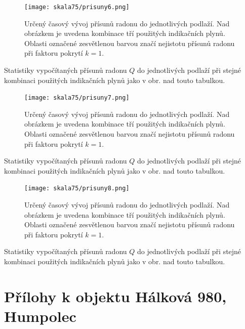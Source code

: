 \begin{figure}[H]
    \centering
    \texttt{[image: skala75/prisuny6.png]}
    \caption{Určený časový vývoj přísunů radonu do jednotlivých podlaží. Nad obrázkem je uvedena kombinace tří použitých indikačních plynů. Oblasti označené zesvětlenou barvou značí nejistotu přísunů radonu při faktoru pokrytí $k=1$.}
    \label{fig:skala75_prisuny6}
\end{figure}
\begin{table}[H]
    \centering
    \caption{Statistiky vypočítaných přísunů radonu $Q$ do jednotlivých podlaží při stejné kombinaci použitých indikačních plynů jako v obr. nad touto tabulkou.}
    \label{tab:skala75_prisuny6}
    
\end{table}

\begin{figure}[H]
    \centering
    \texttt{[image: skala75/prisuny7.png]}
    \caption{Určený časový vývoj přísunů radonu do jednotlivých podlaží. Nad obrázkem je uvedena kombinace tří použitých indikačních plynů. Oblasti označené zesvětlenou barvou značí nejistotu přísunů radonu při faktoru pokrytí $k=1$.}
    \label{fig:skala75_prisuny7}
\end{figure}
\begin{table}[H]
    \centering
    \caption{Statistiky vypočítaných přísunů radonu $Q$ do jednotlivých podlaží při stejné kombinaci použitých indikačních plynů jako v obr. nad touto tabulkou.}
    \label{tab:skala75_prisuny7}
    
\end{table}

\begin{figure}[H]
    \centering
    \texttt{[image: skala75/prisuny8.png]}
    \caption{Určený časový vývoj přísunů radonu do jednotlivých podlaží. Nad obrázkem je uvedena kombinace tří použitých indikačních plynů. Oblasti označené zesvětlenou barvou značí nejistotu přísunů radonu při faktoru pokrytí $k=1$.}
    \label{fig:skala75_prisuny8}
\end{figure}
\begin{table}[H]
    \centering
    \caption{Statistiky vypočítaných přísunů radonu $Q$ do jednotlivých podlaží při stejné kombinaci použitých indikačních plynů jako v obr. nad touto tabulkou.}
    \label{tab:skala75_prisuny8}
    
\end{table}

\chapter{Přílohy k objektu Hálková 980, Humpolec}\label{navesti:priloha_humpolec980}

